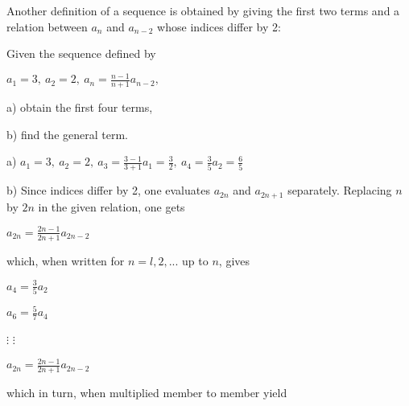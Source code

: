 \documentclass[11pt]{amsbook}
\begin{document}

Another definition of a sequence is obtained by giving the first two terms and a relation between $a_n$ and $a_{n-2}$ whose indices differ by 2:

  \begin{exmp}
  Given the sequence defined by 
    \begin{center}
    $a_1 = 3, \ a_2 = 2, \ a_n = \frac{n-1}{n+1}a_{n-2},$
    \end{center}
  a) obtain the first four terms,
  
  \noindent b) find the general term.
  \end{exmp}
  
  \begin{hSolution}
  a) $a_1 = 3, \ a_2 = 2, \ a_3 = \frac{3-1}{3+1}a_1 = \frac{3}{2}, \ a_4 = \frac{3}{5}a_2 = \frac{6}{5}$

  \noindent b) Since indices differ by 2, one evaluates $a_{2n}$ and $a_{2n+1}$ separately. 
  Replacing $n$ by $2n$ in the given relation, one gets  %
    \begin{center}
    $a_{2n} = \frac{2n-1}{2n+1}a_{2n-2}$
    \end{center}
  which, when written for $n  = l, 2, ...$ up to $n$, gives 
    \begin{center}
    $a_4 = \frac{3}{5}a_2$

    $a_6 = \frac{5}{7}a_4$

    $\vdots$ \qquad $\vdots$

    $a_{2n} = \frac{2n-1}{2n+1}a_{2n-2}$
    \end{center}
  which in turn, when multiplied member to member yield 
  \end{hSolution} %
\end{document}
